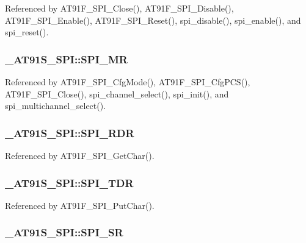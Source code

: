 Referenced by AT91F\_\-SPI\_\-Close(), AT91F\_\-SPI\_\-Disable(), AT91F\_\-SPI\_\-Enable(), AT91F\_\-SPI\_\-Reset(), spi\_\-disable(), spi\_\-enable(), and spi\_\-reset().\hypertarget{struct__AT91S__SPI_53c8dfe2e423e8032df8655ea1c55ae3}{
\subsubsection{ {\bf \_\-AT91S\_\-SPI::SPI\_\-MR}}}
\label{struct__AT91S__SPI_53c8dfe2e423e8032df8655ea1c55ae3}




Referenced by AT91F\_\-SPI\_\-CfgMode(), AT91F\_\-SPI\_\-CfgPCS(), AT91F\_\-SPI\_\-Close(), spi\_\-channel\_\-select(), spi\_\-init(), and spi\_\-multichannel\_\-select().\hypertarget{struct__AT91S__SPI_2e4e0521afa48de31a6c6ab7b395a1b4}{
\subsubsection{ {\bf \_\-AT91S\_\-SPI::SPI\_\-RDR}}}
\label{struct__AT91S__SPI_2e4e0521afa48de31a6c6ab7b395a1b4}




Referenced by AT91F\_\-SPI\_\-GetChar().\hypertarget{struct__AT91S__SPI_11135c353bb5ac7311dbd52934205d6c}{
\subsubsection{ {\bf \_\-AT91S\_\-SPI::SPI\_\-TDR}}}
\label{struct__AT91S__SPI_11135c353bb5ac7311dbd52934205d6c}




Referenced by AT91F\_\-SPI\_\-PutChar().\hypertarget{struct__AT91S__SPI_88f90286651b43730ca1e186224dd921}{
\subsubsection{ {\bf \_\-AT91S\_\-SPI::SPI\_\-SR}}}
\label{struct__AT91S__SPI_88f90286651b43730ca1e186224dd921}




